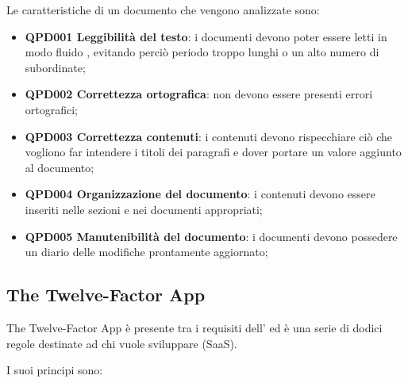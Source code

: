 		Le caratteristiche di un documento che vengono analizzate sono:
		
		\begin{itemize}
			\item \textbf{QPD001 Leggibilità del testo}: i documenti devono poter essere letti in modo fluido , evitando perciò periodo troppo lunghi o un alto numero di subordinate;
			\item \textbf{QPD002 Correttezza ortografica}: non devono essere presenti errori ortografici;
			\item \textbf{QPD003 Correttezza contenuti}: i contenuti devono rispecchiare ciò che vogliono far intendere i titoli dei paragrafi e dover portare un valore aggiunto al documento;
			\item \textbf{QPD004 Organizzazione del documento}: i contenuti devono essere inseriti nelle sezioni e nei documenti appropriati;
			\item \textbf{QPD005 Manutenibilità del documento}: i documenti devono possedere un diario delle modifiche prontamente aggiornato;
		\end{itemize}

\subsection{The Twelve-Factor App}
The Twelve-Factor App è presente tra i requisiti dell' ed è una serie di dodici regole destinate ad chi vuole sviluppare  (SaaS).

I suoi principi sono:

